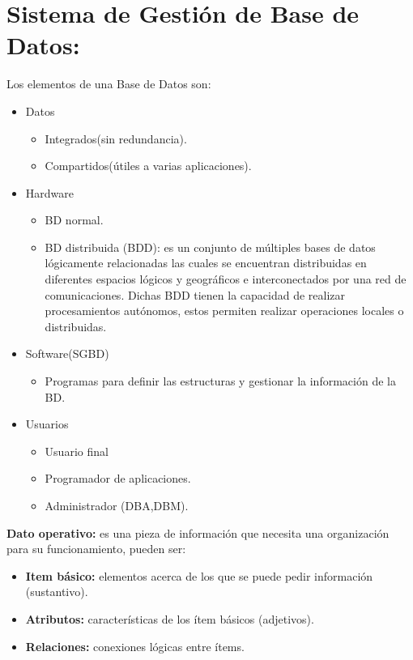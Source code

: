 \documentclass[a4paper,11pt]{article}
\begin{document}
\section{Sistema de Gestión de Base de Datos:}
Los elementos de una Base de Datos son:

\begin{itemize}
\item Datos
	\begin{itemize}
		\item Integrados(sin redundancia).
		\item Compartidos(útiles a varias aplicaciones).
	\end{itemize}
\item Hardware
	\begin{itemize}
		\item BD normal.
		\item BD distribuida (BDD): es un conjunto de múltiples bases de datos lógicamente relacionadas las cuales se encuentran distribuidas en diferentes espacios lógicos y geográficos e interconectados por una red de comunicaciones. Dichas BDD tienen la capacidad de realizar procesamientos autónomos, estos permiten realizar operaciones locales o distribuidas.
	\end{itemize}
\item Software(SGBD)
	\begin{itemize}
		\item Programas para definir las estructuras y gestionar la información de la BD.
	\end{itemize}

\item Usuarios
	\begin{itemize}
		\item Usuario final
		\item Programador de aplicaciones.
		\item Administrador (DBA,DBM).
	\end{itemize}
\end{itemize}

\textbf{Dato operativo:} es una pieza de información que necesita una organización para su funcionamiento, pueden ser:

\begin{itemize}
\item \textbf{Item básico:} elementos acerca de los que se puede pedir información (sustantivo).
\item \textbf{Atributos:} características de los ítem básicos (adjetivos).
\item \textbf{Relaciones:} conexiones lógicas entre ítems.
\end{itemize}
\end{document}
